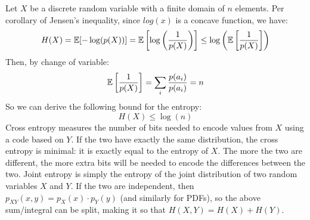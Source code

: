 Let $X$ be a discrete random variable with a finite domain of $n$ elements. Per corollary of Jensen's inequality, since $log(x)$ is a concave function, we have:
\begin{equation*}
    H(X) = \mathbb{E}[-\log(p(X))] = \mathbb{E}\left [\log \left (\frac{1}{p(X)} \right ) \right ] \leq \log\left (\mathbb{E} \left [\frac{1}{p(X)} \right ] \right )
\end{equation*}
Then, by change of variable:
\begin{equation*}
    \mathbb{E}\left [ \frac{1}{p(X)} \right ] = \sum_i \frac{p(a_i)}{p(a_i)} = n
\end{equation*}
So we can derive the following bound for the entropy:
\begin{equation*}
    H(X) \leq \log(n)
\end{equation*}
Cross entropy measures the number of bits needed to encode values from $X$ using a code based on $Y$. If the two have exactly the same distribution, the cross entropy is minimal: it is exactly equal to the entropy of $X$. The more the two are different, the more extra bits will be needed to encode the differences between the two.
Joint entropy is simply the entropy of the joint distribution of two random variables $X$ and $Y$. If the two are independent, then $p_{XY}(x,y) = p_X(x) \cdot p_Y(y)$ (and similarly for PDFs), so the above sum/integral can be split, making it so that $H(X,Y) = H(X) + H(Y)$.
